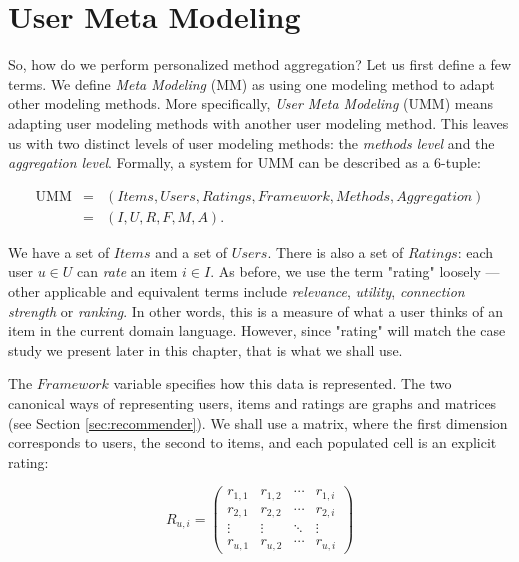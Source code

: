 \section{User Meta Modeling}
\label{sec:usermetamodeling}


So, how do we perform personalized method aggregation?
Let us first define a few terms.
We define \emph{Meta Modeling} (MM) as using one modeling method to adapt other modeling methods.
More specifically, \emph{User Meta Modeling} (UMM) means adapting user modeling methods with another user modeling method.
This leaves us with two distinct levels of user modeling methods: the \emph{methods level} and the \emph{aggregation level}.
Formally, a system for UMM can be described as a 6-tuple:

\begin{eqnarray*}
  \mathrm{UMM} &=& (Items, Users, Ratings, Framework, Methods, Aggregation)\\
               &=& (I,U,R,F,M,A).
\end{eqnarray*}

We have a set of $Items$ and a set of $Users$.
There is also a set of $Ratings$: each user $u \in U$ can \emph{rate} an item $i \in I$.
As before, we use the term "rating" loosely --- other applicable and equivalent terms include \emph{relevance}, \emph{utility},
\emph{connection strength} or \emph{ranking}. In other words, this is a measure of what a user thinks of an item
in the current domain language. However, since "rating" will match the case study we present later in this chapter,
that is what we shall use. 

The $Framework$ variable specifies how this data is represented.
The two canonical ways of representing users, items and ratings are graphs and matrices (see Section \ref{sec:recommender}).
We shall use a matrix, where the first dimension corresponds to users, the second to items, and each populated cell is an explicit rating:

\begin{equation*}
 R_{u,i} =
 \begin{pmatrix}
  r_{1,1} & r_{1,2} & \cdots & r_{1,i} \\
  r_{2,1} & r_{2,2} & \cdots & r_{2,i} \\
  \vdots  & \vdots  & \ddots & \vdots  \\
  r_{u,1} & r_{u,2} & \cdots & r_{u,i}
 \end{pmatrix}
\end{equation*}

